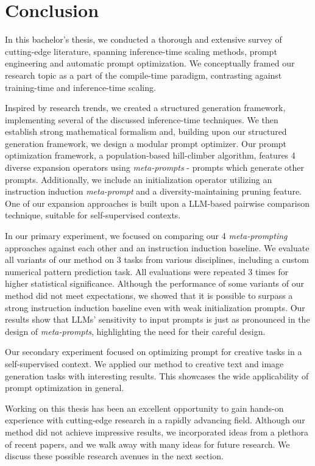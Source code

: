 \section{Conclusion}
In this bachelor's thesis, we conducted a thorough and extensive survey of cutting-edge literature, spanning 
inference-time scaling methods, prompt engineering and automatic prompt optimization.
We conceptually framed our research topic as a part of the compile-time paradigm, contrasting against training-time and inference-time scaling.

Inspired by research trends, we created a structured generation framework, implementing several of the discussed inference-time techniques.
We then establish strong mathematical formalism and, building upon our structured generation framework, we design a modular prompt optimizer.
Our prompt optimization framework, a population-based hill-climber algorithm, features 4 diverse expansion operators using \textit{meta-prompts} - prompts which generate other prompts.
Additionally, we include an initialization operator utilizing an instruction induction \textit{meta-prompt} and a diversity-maintaining pruning feature.
One of our expansion approaches is built upon a LLM-based pairwise comparison technique, suitable for self-supervised contexts.

In our primary experiment, we focused on comparing our 4 \textit{meta-prompting} approaches against each other and an instruction induction baseline.
We evaluate all variants of our method on 3 tasks from various disciplines, including a custom numerical pattern prediction task.
All evaluations were repeated 3 times for higher statistical significance.
Although the performance of some variants of our method did not meet expectations, we showed that it is possible to surpass a strong instruction induction baseline even with weak initialization prompts. 
Our results show that LLMs' sensitivity to input prompts is just as pronounced in the design of \textit{meta-prompts}, highlighting the need for their careful design.

Our secondary experiment focused on optimizing prompt for creative tasks in a self-supervised context.
We applied our method to creative text and image generation tasks with interesting results. 
This showcases the wide applicability of prompt optimization in general.

Working on this thesis has been an excellent opportunity to gain hands-on experience with cutting-edge research in a rapidly advancing field.
Although our method did not achieve impressive results, we incorporated ideas from a plethora of recent papers, 
and we walk away with many ideas for future research.
We discuss these possible research avenues in the next section.

